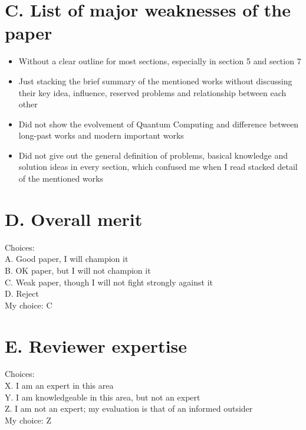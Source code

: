 \documentclass[]{ctexart}
\begin{document}
    \section{C. List of major weaknesses of the paper}
        \begin{itemize}
            \item Without a clear outline for most sections, especially in section 5 and section 7
            \item Just stacking the brief summary of the mentioned works without discussing their key idea, influence, 
            reserved problems and relationship between each other
            \item Did not show the evolvement of Quantum Computing and difference between long-past works and modern
            important works
            \item Did not give out the general definition of problems, basical knowledge and solution ideas in every
            section, which confused me when I read stacked detail of the mentioned works
        \end{itemize}
    \section{D. Overall merit}
    \noindent Choices:\\
    \hspace*{2em}A. Good paper, I will champion it\\
    \hspace*{2em}B. OK paper, but I will not champion it\\
    \hspace*{2em}C. Weak paper, though I will not fight strongly against it\\
    \hspace*{2em}D. Reject\\
    My choice: C
    \section{E. Reviewer expertise}
    \noindent Choices:\\
    \hspace*{2em}X. I am an expert in this area\\
    \hspace*{2em}Y. I am knowledgeable in this area, but not an expert\\
    \hspace*{2em}Z. I am not an expert; my evaluation is that of an informed outsider\\
    My choice: Z
\end{document}
